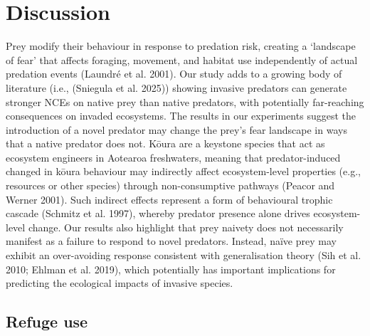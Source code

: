 \documentclass[
  12pt,
  a4paper,
]{scrbook}
\begin{document}
\chapter{Discussion}\label{discussion}

Prey modify their behaviour in response to predation risk, creating a
`landscape of fear' that affects foraging, movement, and habitat use
independently of actual predation events (Laundré et al. 2001). Our
study adds to a growing body of literature (i.e., (Sniegula et al.
2025)) showing invasive predators can generate stronger NCEs on native
prey than native predators, with potentially far-reaching consequences
on invaded ecosystems. The results in our experiments suggest the
introduction of a novel predator may change the prey's fear landscape in
ways that a native predator does not. Kōura are a keystone species that
act as ecosystem engineers in Aotearoa freshwaters, meaning that
predator-induced changed in kōura behaviour may indirectly affect
ecosystem-level properties (e.g., resources or other species) through
non-consumptive pathways (Peacor and Werner 2001). Such indirect effects
represent a form of behavioural trophic cascade (Schmitz et al. 1997),
whereby predator presence alone drives ecosystem-level change. Our
results also highlight that prey naivety does not necessarily manifest
as a failure to respond to novel predators. Instead, naïve prey may
exhibit an over-avoiding response consistent with generalisation theory
(Sih et al. 2010; Ehlman et al. 2019), which potentially has important
implications for predicting the ecological impacts of invasive species.

\section{Refuge use}\label{refuge-use}
\end{document}
